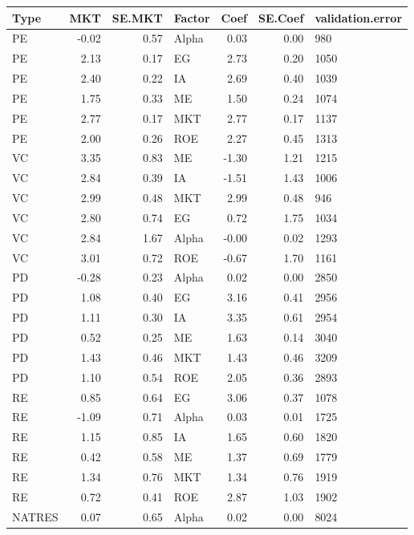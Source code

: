 \documentclass[12pt]{article}
\begin{document}
\begin{table}[ht]
	\centering
	\begin{tabular}{lrrlrrl}
		\hline
		Type & MKT & SE.MKT & Factor & Coef & SE.Coef & validation.error \\ 
		\hline
		PE & -0.02 & 0.57 & Alpha & 0.03 & 0.00 & 980 \\ 
		PE & 2.13 & 0.17 & EG & 2.73 & 0.20 & 1050 \\ 
		PE & 2.40 & 0.22 & IA & 2.69 & 0.40 & 1039 \\ 
		PE & 1.75 & 0.33 & ME & 1.50 & 0.24 & 1074 \\ 
		PE & 2.77 & 0.17 & MKT & 2.77 & 0.17 & 1137 \\ 
		PE & 2.00 & 0.26 & ROE & 2.27 & 0.45 & 1313 \\ 
		VC & 3.35 & 0.83 & ME & -1.30 & 1.21 & 1215 \\ 
		VC & 2.84 & 0.39 & IA & -1.51 & 1.43 & 1006 \\ 
		VC & 2.99 & 0.48 & MKT & 2.99 & 0.48 & 946 \\ 
		VC & 2.80 & 0.74 & EG & 0.72 & 1.75 & 1034 \\ 
		VC & 2.84 & 1.67 & Alpha & -0.00 & 0.02 & 1293 \\ 
		VC & 3.01 & 0.72 & ROE & -0.67 & 1.70 & 1161 \\ 
		PD & -0.28 & 0.23 & Alpha & 0.02 & 0.00 & 2850 \\ 
		PD & 1.08 & 0.40 & EG & 3.16 & 0.41 & 2956 \\ 
		PD & 1.11 & 0.30 & IA & 3.35 & 0.61 & 2954 \\ 
		PD & 0.52 & 0.25 & ME & 1.63 & 0.14 & 3040 \\ 
		PD & 1.43 & 0.46 & MKT & 1.43 & 0.46 & 3209 \\ 
		PD & 1.10 & 0.54 & ROE & 2.05 & 0.36 & 2893 \\ 
		RE & 0.85 & 0.64 & EG & 3.06 & 0.37 & 1078 \\ 
		RE & -1.09 & 0.71 & Alpha & 0.03 & 0.01 & 1725 \\ 
		RE & 1.15 & 0.85 & IA & 1.65 & 0.60 & 1820 \\ 
		RE & 0.42 & 0.58 & ME & 1.37 & 0.69 & 1779 \\ 
		RE & 1.34 & 0.76 & MKT & 1.34 & 0.76 & 1919 \\ 
		RE & 0.72 & 0.41 & ROE & 2.87 & 1.03 & 1902 \\ 
		NATRES & 0.07 & 0.65 & Alpha & 0.02 & 0.00 & 8024 \\ 

\end{tabular}
\end{table}
\end{document}
